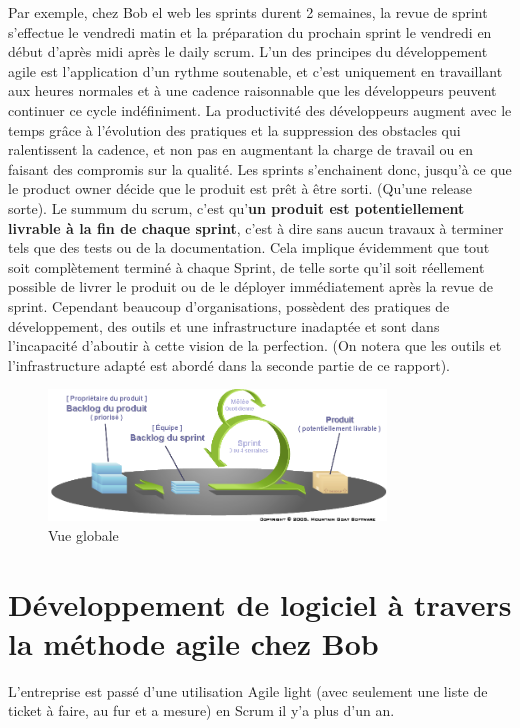 Par exemple, chez Bob el web les sprints durent 2 semaines, la revue de sprint s'effectue le vendredi matin et la préparation du prochain sprint le vendredi en début d'après midi après le daily scrum. 
\jumpOne
L'un des principes du développement agile est l'application d'un rythme soutenable, et c'est uniquement en travaillant aux heures normales et à une cadence raisonnable que les développeurs peuvent continuer ce cycle indéfiniment. 
La productivité des développeurs augment avec le temps grâce à l'évolution des pratiques et la suppression des obstacles qui ralentissent la cadence, et non pas en augmentant la charge de travail ou en faisant des compromis sur la qualité. 
\jumpTwo
Les sprints s'enchainent donc, jusqu'à ce que le product owner décide que le produit est prêt à être sorti. (Qu'une release sorte). 
Le summum du scrum, c'est qu'\textbf{un produit est potentiellement livrable à la fin de chaque sprint}, c'est à dire sans aucun travaux à terminer tels que des tests ou de la documentation.
Cela implique évidemment que tout soit complètement terminé à chaque Sprint, de telle sorte qu'il soit réellement possible de livrer le produit ou de le déployer immédiatement après la revue de sprint. 
\jumpOne
Cependant beaucoup d'organisations, possèdent des pratiques de développement, des outils et une infrastructure inadaptée et sont dans l'incapacité d'aboutir à cette vision de la perfection.
(On notera que les outils et l'infrastructure adapté est abordé dans la seconde partie de ce rapport). 


\begin{figure}[h!]
\centering
\includegraphics[width=0.8\textwidth]{assets/scrum.png}
\caption{Vue globale}
\label{fig:my_label}
\end{figure}

\newpage

\section{Développement de logiciel à travers la méthode agile chez Bob}
L'entreprise est passé d'une utilisation Agile light (avec seulement une liste de ticket à faire, au fur et a mesure) en Scrum il y'a plus d'un an. 

